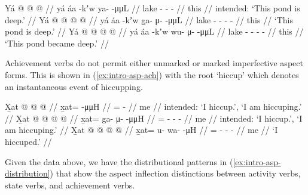 \documentclass[12pt,letterpaper,oneside,article]{memoir}
\begin{document}
\pex
\a\label{ex:intro-asp-stv-impfv}%
\ljudge{*}%
%
\begingl
	\gla	Yá  @ {}  @ {} @ {} //
	\glb	yá áa -kʼw ya-  -μμL //
	\glc	{} lake - -  - //
	\gld	this  {}  {} {} //
	\glft	intended: ‘This pond is deep.’
		//
\endgl
\a\label{ex:intro-asp-stv-extimpfv}%
%
\begingl
	\gla	Yá  @ {}  @ {} @ {} @ {} //
	\glb	yá áa -kʼw g̱a- μ-  -μμL //
	\glc	{} lake - - -  - //
	\gld	this  {}  {} {} {} //
	\glft	‘This pond is deep.’
		//
\endgl
\a\label{ex:intro-asp-stv-pfv}%
%
\begingl
	\gla	Yá  @ {}  @ {} @ {} @ {} //
	\glb	yá áa -kʼw wu- μ-  -μμL //
	\glc	{} lake - - -  - //
	\gld	this  {}  {} {} {} //
	\glft	‘This pond became deep.’
		//
\endgl
\xe

Achievement verbs do not permit either unmarked or marked imperfective aspect forms.
This is shown in (\ref{ex:intro-asp-ach}) with the root  ‘hiccup’ which denotes an instantaneous event of hiccupping.

\pex\label{ex:intro-asp-ach}%
\a\label{ex:intro-asp-ach-impfv}%
\ljudge{*}%
%
\begingl
	\gla	X̱at @  @ {} @ {} //
	\glb	x̱at=  -μμH //
	\glc	{}=  - //
	\gld	me  {} {} {} //
	\glft	intended: ‘I hiccup.’, ‘I am hiccuping.’
		//
\endgl
\a\label{ex:intro-asp-ach-extimpfv}%
\ljudge{*}%
%
\begingl
	\gla	X̱at @  @ {} @ {} @ {} //
	\glb	x̱at= ga- μ-  -μμH //
	\glc	{}= - -  - //
	\gld	me  {} {} {} //
	\glft	intended: ‘I hiccup.’, ‘I am hiccuping.’
		//
\endgl
\a\label{ex:intro-asp-ach-pfv}%
%
\begingl
	\gla	X̱at @  @ {} @ {} @ {} //
	\glb	x̱at= u- wa-  -μH //
	\glc	{}= - -  - //
	\gld	me  {} {} {} //
	\glft	‘I hiccuped.’
		//
\endgl
\xe

Given the data above, we have the distributional patterns in (\ref{ex:intro-asp-distribution}) that show the aspect inflection distinctions between activity verbs, state verbs, and achievement verbs.
\end{document}
